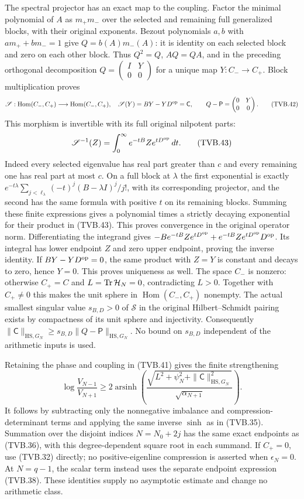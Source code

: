 The spectral projector has an exact map to the coupling.
Factor the minimal polynomial of $A$ as $m_+m_-$ over the
selected and remaining full generalized blocks, with their
original exponents. Bezout polynomials $a,b$ with
$am_++bm_-=1$ give $Q=b(A)m_-(A)$: it is identity on each
selected block and zero on each other block. Thus $Q^2=Q$,
$AQ=QA$, and in the preceding orthogonal decomposition
$Q=\left(\begin{smallmatrix}I&Y\\0&0\end{smallmatrix}\right)$
for a unique map $Y:C_-\to C_+$. Block multiplication proves
\[
 \mathscr S:\operatorname{Hom}(C_-,C_+)
       \longrightarrow\operatorname{Hom}(C_-,C_+),\quad
 \mathscr S(Y)=BY-YD^{\rm op}=\mathsf C,
 \qquad Q-\mathsf P=
 \begin{pmatrix}0&Y\\0&0\end{pmatrix}.
 \tag{TVB.42}
\]
This morphism is invertible with its full original nilpotent parts:
\[
 \mathscr S^{-1}(Z)=\int_0^\infty e^{-tB}Ze^{tD^{\rm op}}\,dt.
 \tag{TVB.43}
\]
Indeed every selected eigenvalue has real part greater than $c$
and every remaining one has real part at most $c$. On a full
block at $\lambda$ the first exponential is exactly
$e^{-t\lambda}\sum_{j<\ell_\lambda}(-t)^j(B-\lambda I)^j/j!$,
with its corresponding projector, and the second has the same
formula with positive $t$ on its remaining blocks. Summing these
finite expressions gives a polynomial times a strictly decaying
exponential for their product in (TVB.43). This proves convergence
in the original operator norm. Differentiating the integrand gives
$-B e^{-tB}Ze^{tD^{\rm op}}+e^{-tB}Ze^{tD^{\rm op}}D^{\rm op}$.
Its integral has lower endpoint $Z$ and zero upper endpoint,
proving the inverse identity. If $BY-YD^{\rm op}=0$, the same
product with $Z=Y$ is constant and decays to zero, hence $Y=0$.
This proves uniqueness as well. The space $C_-$ is nonzero:
otherwise $C_+=C$ and $L=\operatorname{Tr}\mathcal H_N=0$, contradicting $L>0$.
Together with $C_+\ne0$ this makes the unit sphere in
$\operatorname{Hom}(C_-,C_+)$ nonempty. The actual smallest singular
value $s_{B,D}>0$ of $\mathscr S$ in the original Hilbert--Schmidt
pairing exists by compactness of its unit sphere and injectivity.
Consequently
$\|\mathsf C\|_{\mathrm{HS},G_N}
 \ge s_{B,D}\|Q-\mathsf P\|_{\mathrm{HS},G_N}$.
No bound on $s_{B,D}$ independent of the arithmetic inputs is used.

Retaining the phase and coupling in (TVB.41) gives the finite
strengthening
\[
 \log\frac{V_{N-1}}{V_{N+1}}
 \ge2\operatorname{arsinh}\left(
 \frac{\sqrt{L^2+\psi_N^2+\|\mathsf C\|_{\mathrm{HS},G_N}^2}}
      {\sqrt{\alpha_{N+1}}}\right).
 \tag{TVB.44}
\]
It follows by subtracting only the nonnegative imbalance and
compression-determinant terms and applying the same inverse
$\sinh$ as in (TVB.35). Summation over the disjoint indices
$N=N_0+2j$ has the same exact endpoints as (TVB.36), with this
degree-dependent square root in each summand. If $C_+=0$, use
(TVB.32) directly; no positive-eigenline compression is asserted
when $\epsilon_N=0$. At $N=q-1$, the scalar term instead uses
the separate endpoint expression (TVB.38). These identities supply
no asymptotic estimate and change no arithmetic class.

